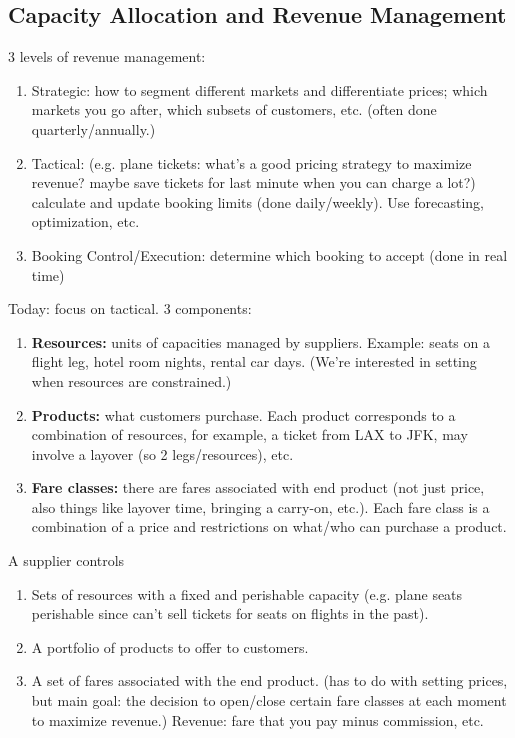 \subsection{Capacity Allocation and Revenue Management}

3 levels of revenue management:

\begin{enumerate}

\item Strategic: how to segment different markets and differentiate prices; which markets you go after, which subsets of customers, etc. (often done quarterly/annually.)

\item Tactical: (e.g. plane tickets: what's a good pricing strategy to maximize revenue? maybe save tickets for last minute when you can charge a lot?) calculate and update booking limits (done daily/weekly). Use forecasting, optimization, etc.

\item Booking Control/Execution: determine which booking to accept (done in real time)

\end{enumerate}

Today: focus on tactical. 3 components:

\begin{enumerate}

\item \textbf{Resources:} units of capacities managed by suppliers. Example: seats on a flight leg, hotel room nights, rental car days. (We're interested in setting when resources are constrained.)

\item \textbf{Products:} what customers purchase. Each product corresponds to a combination of resources, for example, a ticket from LAX to JFK, may involve a layover (so 2 legs/resources), etc.

\item \textbf{Fare classes:} there are fares associated with end product (not just price, also things like layover time, bringing a carry-on, etc.). Each fare class is a combination of a price and restrictions on what/who can purchase a product.

\end{enumerate}

A supplier controls

\begin{enumerate}

\item Sets of resources with a fixed and perishable capacity (e.g. plane seats perishable since can't sell tickets for seats on flights in the past).

\item A portfolio of products to offer to customers.

\item A set of fares associated with the end product. (has to do with setting prices, but main goal: the decision to open/close certain fare classes at each moment to maximize revenue.) Revenue: fare that you pay minus commission, etc.

\end{enumerate}

